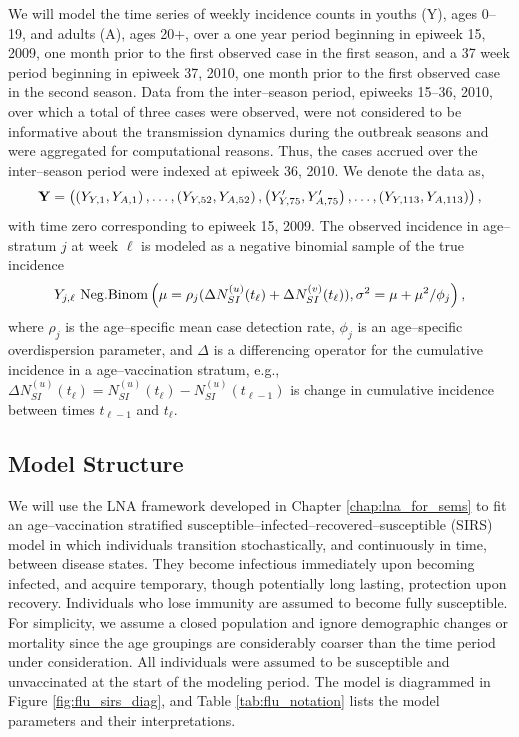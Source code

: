 We will model the time series of weekly incidence counts in youths (Y), ages 0--19, and adults (A), ages 20+, over a one year period beginning in epiweek 15, 2009, one month prior to the first observed case in the first season, and a 37 week period beginning in epiweek 37, 2010, one month prior to the first observed case in the second season. Data from the inter--season period, epiweeks 15--36, 2010, over which a total of three cases were observed, were not considered to be informative about the transmission dynamics during the outbreak seasons and were aggregated for computational reasons. Thus, the cases accrued over the inter--season period were indexed at epiweek 36, 2010. We denote the data as, $$ \mathbf{Y} = \left (\left (Y_{Y,1},Y_{A,1}\right ),\dots,\left (Y_{Y,52},Y_{A,52}\right ),\left (Y^\prime_{Y,75},Y^\prime_{A,75}\right ),\dots,\left (Y_{Y,113},Y_{A,113}\right )\right ), $$ with time zero corresponding to epiweek 15, 2009. The observed incidence in age--stratum $ j $ at week $ \ell $ is modeled as a negative binomial sample of the true incidence \begin{equation}
\label{flu_emit_prob}
Y_{j,\ell} ~ \mathrm{Neg.Binom}\left (\mu = \rho_j(\Delta N_{SI}^{(u)}(t_\ell) + \Delta N_{SI}^{(v)}(t_\ell)), \sigma^2 = \mu + \mu^2 / \phi_j\right ),
\end{equation}
where $ \rho_j $ is the age--specific mean case detection rate, $ \phi_j $ is an age--specific overdispersion parameter, and $ \Delta $ is a differencing operator for the cumulative incidence in a age--vaccination stratum, e.g., $ \Delta N_{SI}^{(u)}(t_\ell) = N_{SI}^{(u)}(t_\ell) - N_{SI}^{(u)}(t_{\ell-1}) $ is change in cumulative incidence between times $ t_{\ell-1} $ and $ t_\ell $.

\subsection{Model Structure}
\label{subsec:flu_modstructure}

We will use the LNA framework developed in Chapter \ref{chap:lna_for_sems} to fit an age--vaccination stratified susceptible--infected--recovered--susceptible (SIRS) model in which individuals transition stochastically, and continuously in time, between disease states. They become infectious immediately upon becoming infected, and acquire temporary, though potentially long lasting, protection upon recovery. Individuals who lose immunity are assumed to become fully susceptible. For simplicity, we assume a closed population and ignore demographic changes or mortality since the age groupings are considerably coarser than the time period under consideration. All individuals were assumed to be susceptible and unvaccinated at the start of the modeling period. The model is diagrammed in Figure \ref{fig:flu_sirs_diag}, and Table \ref{tab:flu_notation} lists the model parameters and their interpretations. 

